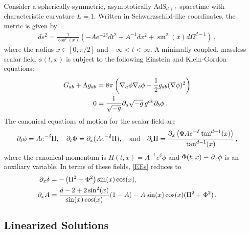 \documentclass[../PhD.tex]{subfiles}
\begin{document}
Consider a spherically-symmetric, asymptotically AdS$_{d+1}$ spacetime with characteristic curvature $L=1$. Written in Schwarzschild-like coordinates, the metric is given by
\begin{align}
ds^2 = \frac{1}{\cos^2(x)} \left( -Ae^{-2\delta} dt^2 + A^{-1}dx^2 + \sin^2(x) d\Omega^{d-1}\right) \, ,
\end{align}
where the radius $x \in [0,\pi/2]$ and $-\infty < t < \infty$. A minimally-coupled, massless scalar field $\phi(t,x)$ is subject to the following Einstein and Klein-Gordon equations:
\begin{align}
\label{EEs}
G_{ab} + \Lambda g_{ab} &= 8\pi \left( \nabla_a \phi \nabla_b \phi - \frac{1}{2} g_{ab} (\nabla \phi)^2 \right) \\
\label{KG}
0 &= \frac{1}{\sqrt{-g}} \partial_a \sqrt{-g} \, g^{ab} \partial_b \phi \, .
\end{align}
The canonical equations of motion for the scalar field are
\begin{align}
\partial_t \phi = A e^{-\delta} \Pi, \quad \partial_t \Phi = \partial_x ( A e^{-\delta} \Pi), \quad \text{and} \quad \partial_t \Pi = \frac{\partial_x \left(\Phi A e^{-\delta} \tan^{d-1} (x) \right)}{\tan^{d-1}(x)} \, ,
\end{align}
where the canonical momentum is $\Pi(t,x) = A^{-1}e^\delta \phi$ and $\Phi(t,x) \equiv \partial_x \phi$ is an auxiliary variable. In terms of these fields, \eqref{EEs} reduces to 
\begin{align}
	\label{EE const1}
	\partial_x \delta &= - \left( \Pi^2 + \Phi^2 \right) \sin(x) \cos(x), \\
	\label{EE const2}
	\partial_x A &= \frac{d - 2 + 2\sin^2(x)}{\sin (x)\cos(x)} (1 - A) - A \sin(x) \cos(x) (\Pi^2 + \Phi^2) \, .
\end{align}


\subsection{Linearized Solutions}
\end{document}
